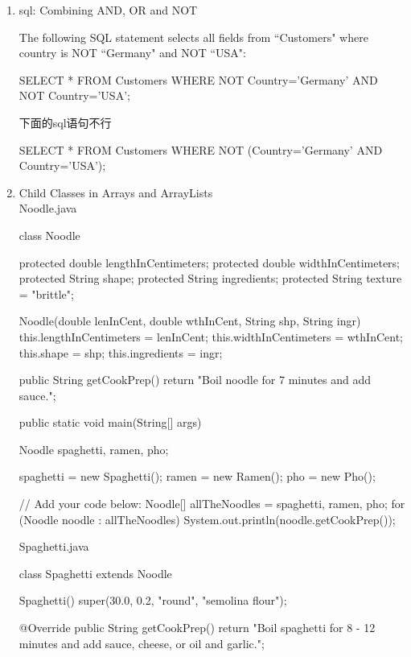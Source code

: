 \documentclass[a4paper,12pt]{article}
\begin{document}
\fontsize{14pt}{15.6pt}
\selectfont

\begin{enumerate}

\item sql: Combining AND, OR and NOT

The following SQL statement selects all fields from ``Customers" where country is NOT ``Germany" and NOT ``USA":
\begin{sqlcode}
SELECT * FROM Customers
WHERE NOT Country='Germany' AND NOT Country='USA';
\end{sqlcode}

下面的sql语句不行
\begin{sqlcode}
SELECT * FROM Customers 
WHERE NOT (Country='Germany' AND Country='USA');
\end{sqlcode}

\item Child Classes in Arrays and ArrayLists\\
Noodle.java
\begin{javacode}
class Noodle {  
  protected double lengthInCentimeters;
  protected double widthInCentimeters;
  protected String shape;
  protected String ingredients;
  protected String texture = "brittle";
  
  Noodle(double lenInCent, double wthInCent, String shp, String ingr) {    
    this.lengthInCentimeters = lenInCent;
    this.widthInCentimeters = wthInCent;
    this.shape = shp;
    this.ingredients = ingr;    
  }
  
  public String getCookPrep() {    
    return "Boil noodle for 7 minutes and add sauce.";    
  }
    
  public static void main(String[] args) {    
    Noodle spaghetti, ramen, pho;
    
    spaghetti = new Spaghetti();
    ramen = new Ramen();
    pho = new Pho();
    
    // Add your code below:
    Noodle[] allTheNoodles = {spaghetti, ramen, pho};
    for (Noodle noodle : allTheNoodles) {
      System.out.println(noodle.getCookPrep());
    }
  }  
}
\end{javacode}

Spaghetti.java
\begin{javacode}
class Spaghetti extends Noodle {  
  Spaghetti() {    
  	super(30.0, 0.2, "round", "semolina flour");    
  }
  
  @Override
  public String getCookPrep() {    
    return "Boil spaghetti for 8 - 12 minutes and add sauce, cheese, or oil and garlic.";    
  }  
}
\end{javacode}


\end{enumerate}
\end{document}

